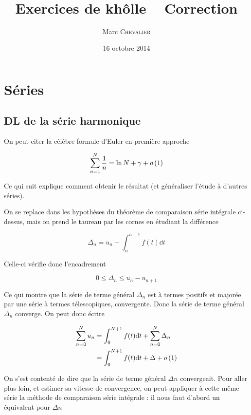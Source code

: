 

\title{Exercices de khôlle \--- Correction}
\author{Marc \textsc{Chevalier}}
\date{16 octobre 2014}


\maketitle
\setcounter{tocdepth}{2}
\tableofcontents

\section{Séries}

\subsection{DL de la série harmonique}

On peut citer la célèbre formule d'Euler en première approche

\[
    \sum_{n=1}^N\frac{1}{n}=\ln N+\gamma+o\left(1\right)
\]

Ce qui suit explique comment obtenir le résultat (et généraliser l'étude à d'autres séries).

On se replace dans les hypothèses du théorème de comparaison série intégrale ci-dessus, mais on prend le taureau par les cornes en étudiant la différence

\[
    \Delta_n = u_n- \int_n^{n+1} f(t) \dd t
\]

Celle-ci vérifie donc l'encadrement

\[
    0\leqslant \Delta_n \leqslant u_n-u_{n+1}
\]

Ce qui montre que la série de terme général $\Delta_n$ est à termes positifs et majorée par une série à termes télescopiques, convergente. Donc la série de terme général $\Delta_n$ converge. On peut donc écrire

\[
    \begin{aligned}
        \sum_{n=0}^N u_n&=\int_0^{N+1} f(t)\mathrm{d} t+\sum_{n=0}^N \Delta_n\\
        &=\int_0^{N+1} f(t) \mathrm{d} t+\Delta + o\left(1\right)
    \end{aligned}
\]
    
On s'est contenté de dire que la série de terme général $\Delta n$ convergeait. Pour aller plus loin, et estimer sa vitesse de convergence, on peut appliquer à cette même série la méthode de comparaison série intégrale : il nous faut d'abord un équivalent pour $\Delta n$

